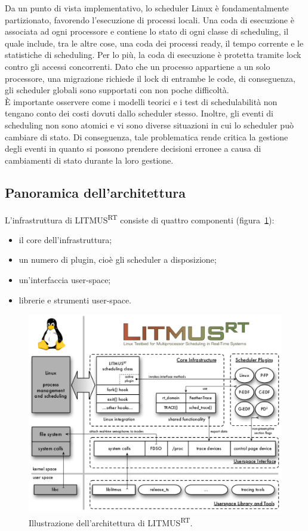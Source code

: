 Da un punto di vista implementativo, lo scheduler Linux è fondamentalmente partizionato, favorendo l'esecuzione di processi locali. Una coda di esecuzione è associata ad ogni processore e contiene lo stato di ogni classe di scheduling, il quale include, tra le altre cose, una coda dei processi ready, il tempo corrente e le statistiche di scheduling. Per lo più, la coda di esecuzione è protetta tramite lock contro gli accessi concorrenti. Dato che un processo appartiene a un solo processore, una migrazione richiede il lock di entrambe le code, di conseguenza, gli scheduler globali sono supportati con non poche difficoltà.\\

\`E importante osservere come i modelli teorici e i test di schedulabilità non tengano conto dei costi dovuti dallo scheduler stesso. Inoltre, gli eventi di scheduling non sono atomici e vi sono diverse situazioni in cui lo scheduler può cambiare di stato. Di conseguenza, tale problematica rende critica la gestione degli eventi in quanto si possono prendere decisioni erronee a causa di cambiamenti di stato durante la loro gestione.

\subsection{Panoramica dell'architettura}
\label{sec:intro.arch}

L'infrastruttura di LITMUS\textsuperscript{RT} consiste di quattro componenti (figura~\ref{fig:litmus_arch}):

\begin{itemize}
\item il core dell'infrastruttura;
\item un numero di plugin, cioè gli scheduler a disposizione;
\item un'interfaccia user-space;
\item librerie e strumenti user-space.
\end{itemize}

\begin{figure}
\includegraphics[width=\linewidth]{images/litmus_arch.jpeg}
\caption{Illustrazione dell'architettura di LITMUS\textsuperscript{RT}.}
\label{fig:litmus_arch}
\end{figure}

